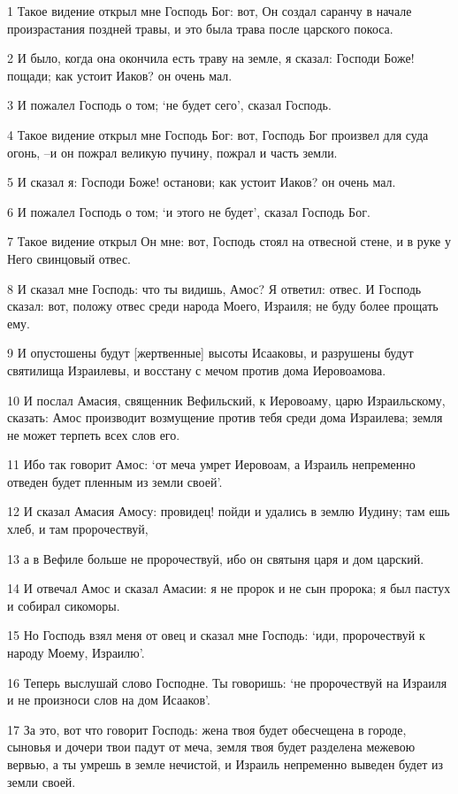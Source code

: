 \par 1 Такое видение открыл мне Господь Бог: вот, Он создал саранчу в начале произрастания поздней травы, и это была трава после царского покоса.
\par 2 И было, когда она окончила есть траву на земле, я сказал: Господи Боже! пощади; как устоит Иаков? он очень мал.
\par 3 И пожалел Господь о том; `не будет сего', сказал Господь.
\par 4 Такое видение открыл мне Господь Бог: вот, Господь Бог произвел для суда огонь, --и он пожрал великую пучину, пожрал и часть земли.
\par 5 И сказал я: Господи Боже! останови; как устоит Иаков? он очень мал.
\par 6 И пожалел Господь о том; `и этого не будет', сказал Господь Бог.
\par 7 Такое видение открыл Он мне: вот, Господь стоял на отвесной стене, и в руке у Него свинцовый отвес.
\par 8 И сказал мне Господь: что ты видишь, Амос? Я ответил: отвес. И Господь сказал: вот, положу отвес среди народа Моего, Израиля; не буду более прощать ему.
\par 9 И опустошены будут [жертвенные] высоты Исааковы, и разрушены будут святилища Израилевы, и восстану с мечом против дома Иеровоамова.
\par 10 И послал Амасия, священник Вефильский, к Иеровоаму, царю Израильскому, сказать: Амос производит возмущение против тебя среди дома Израилева; земля не может терпеть всех слов его.
\par 11 Ибо так говорит Амос: `от меча умрет Иеровоам, а Израиль непременно отведен будет пленным из земли своей'.
\par 12 И сказал Амасия Амосу: провидец! пойди и удались в землю Иудину; там ешь хлеб, и там пророчествуй,
\par 13 а в Вефиле больше не пророчествуй, ибо он святыня царя и дом царский.
\par 14 И отвечал Амос и сказал Амасии: я не пророк и не сын пророка; я был пастух и собирал сикоморы.
\par 15 Но Господь взял меня от овец и сказал мне Господь: `иди, пророчествуй к народу Моему, Израилю'.
\par 16 Теперь выслушай слово Господне. Ты говоришь: `не пророчествуй на Израиля и не произноси слов на дом Исааков'.
\par 17 За это, вот что говорит Господь: жена твоя будет обесчещена в городе, сыновья и дочери твои падут от меча, земля твоя будет разделена межевою вервью, а ты умрешь в земле нечистой, и Израиль непременно выведен будет из земли своей.

